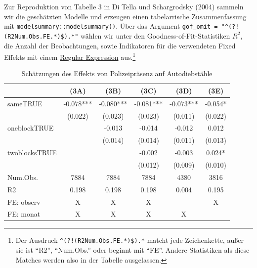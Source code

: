 \documentclass[
  a4paper,
  DIV=11,
  oneside]{scrreprt}
\newenvironment{Shaded}{\begin{snugshade}}{\end{snugshade}}
\newcommand{\AttributeTok}[1]{\textcolor[rgb]{0.40,0.45,0.13}{#1}}
\newcommand{\CommentTok}[1]{\textcolor[rgb]{0.37,0.37,0.37}{#1}}
\newcommand{\FunctionTok}[1]{\textcolor[rgb]{0.28,0.35,0.67}{#1}}
\newcommand{\NormalTok}[1]{\textcolor[rgb]{0.00,0.23,0.31}{#1}}
\newcommand{\OtherTok}[1]{\textcolor[rgb]{0.00,0.23,0.31}{#1}}
\newcommand{\StringTok}[1]{\textcolor[rgb]{0.13,0.47,0.30}{#1}}
\begin{document}
Zur Reproduktion von Tabelle 3 in Di Tella und Schargrodsky (2004)
sammeln wir die geschätzten Modelle und erzeugen einen tabelarrische
Zusammenfassung mit \texttt{modelsummary::modelsummary()}. Über das
Argument
\texttt{gof\_omit\ =\ "\^{}(?!(R2\textbar{}Num.Obs.\textbar{}FE.*)\$).*"}
wählen wir unter den Goodness-of-Fit-Statistiken \(R^2\), die Anzahl der
Beobachtungen, sowie Indikatoren für die verwendeten Fixed Effekts mit
einem \href{https://de.wikipedia.org/wiki/Regulärer_Ausdruck}{Regular
Expression} aus.\footnote{Der Ausdruck
  \texttt{\^{}(?!(R2\textbar{}Num.Obs.\textbar{}FE.*)\$).*} matcht jede
  Zeichenkette, außer sie ist ``R2'', ``Num.Obs.'' oder beginnt mit
  ``FE''. Andere Statistiken als diese Matches werden also in der
  Tabelle ausgelassen.}

\begin{Shaded}
\end{Shaded}

\setlength{\LTpost}{0mm}

\begin{longtable}{lccccc}

\caption{\label{tbl-ditella3}Schätzungen des Effekts von Polizeipräsenz
auf Autodiebstähle}

\tabularnewline

\toprule
  & (3A) & (3B) & (3C) & (3D) & (3E) \\ 
\midrule\addlinespace[2.5pt]
sameTRUE & -0.078*** & -0.080*** & -0.081*** & -0.073*** & -0.054* \\ 
 & (0.022) & (0.023) & (0.023) & (0.011) & (0.022) \\ 
oneblockTRUE &  & -0.013 & -0.014 & -0.012 & 0.012 \\ 
 &  & (0.014) & (0.014) & (0.011) & (0.013) \\ 
twoblocksTRUE &  &  & -0.002 & -0.003 & 0.024* \\ 
 &  &  & (0.012) & (0.009) & (0.010) \\ 
Num.Obs. & 7884 & 7884 & 7884 & 4380 & 3816 \\ 
R2 & 0.198 & 0.198 & 0.198 & 0.004 & 0.195 \\ 
FE: observ & X & X & X &  & X \\ 
FE: monat & X & X & X & X &  \\ 
\bottomrule

\end{longtable}
\end{document}
